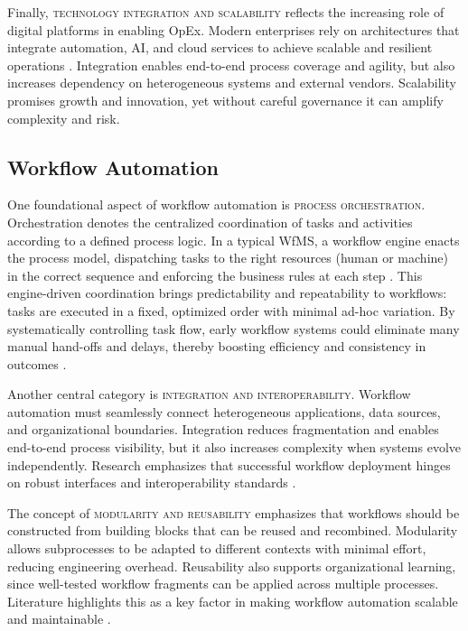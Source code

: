 Finally, \textsc{technology integration and scalability} reflects the increasing role of digital platforms in enabling OpEx. Modern enterprises rely on architectures that integrate automation, AI, and cloud services to achieve scalable and resilient operations \parencite{owoadeSystematic2024}. Integration enables end-to-end process coverage and agility, but also increases dependency on heterogeneous systems and external vendors. Scalability promises growth and innovation, yet without careful governance it can amplify complexity and risk.

\subsection{Workflow Automation}\label{subsec:workflow-auto}
One foundational aspect of workflow automation is \textsc{process orchestration}. Orchestration denotes the centralized coordination of tasks and activities according to a defined process logic. In a typical WfMS, a workflow engine enacts the process model, dispatching tasks to the right resources (human or machine) in the correct sequence and enforcing the business rules at each step \parencite{basuResearch2002}. This engine-driven coordination brings predictability and repeatability to workflows: tasks are executed in a fixed, optimized order with minimal ad-hoc variation. By systematically controlling task flow, early workflow systems could eliminate many manual hand-offs and delays, thereby boosting efficiency and consistency in outcomes \parencite{stohrWorkflow2001}.

Another central category is \textsc{integration and interoperability}. Workflow automation must seamlessly connect heterogeneous applications, data sources, and organizational boundaries. Integration reduces fragmentation and enables end-to-end process visibility, but it also increases complexity when systems evolve independently. Research emphasizes that successful workflow deployment hinges on robust interfaces and interoperability standards \parencite{stohrWorkflow2001}.

The concept of \textsc{modularity and reusability} emphasizes that workflows should be constructed from building blocks that can be reused and recombined. Modularity allows subprocesses to be adapted to different contexts with minimal effort, reducing engineering overhead. Reusability also supports organizational learning, since well-tested workflow fragments can be applied across multiple processes. Literature highlights this as a key factor in making workflow automation scalable and maintainable \parencite{stohrWorkflow2001}.

